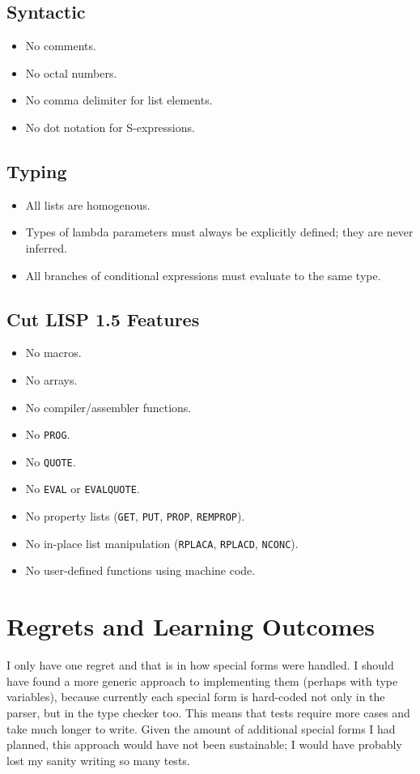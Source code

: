 \documentclass[a4paper, 12pt]{article}
\begin{document}
\subsection{Syntactic}
\begin{itemize}
    \item No comments.
    \item No octal numbers.
    \item No comma delimiter for list elements.
    \item No dot notation for S-expressions.
\end{itemize}

\subsection{Typing}
\begin{itemize}
    \item All lists are homogenous.
    \item Types of lambda parameters must always be explicitly defined; they are never inferred.
    \item All branches of conditional expressions must evaluate to the same type.
\end{itemize}

\subsection{Cut LISP 1.5 Features}
\begin{itemize}
    \item No macros.
    \item No arrays.
    \item No compiler/assembler functions.
    \item No \texttt{PROG}.
    \item No \texttt{QUOTE}.
    \item No \texttt{EVAL} or \texttt{EVALQUOTE}.
    \item No property lists (\texttt{GET}, \texttt{PUT}, \texttt{PROP}, \texttt{REMPROP}).
    \item No in-place list manipulation (\texttt{RPLACA}, \texttt{RPLACD}, \texttt{NCONC}).
    \item No user-defined functions using machine code.
\end{itemize}

\section{Regrets and Learning Outcomes}
I only have one regret and that is in how special forms were handled. I should have found a more generic approach to implementing them (perhaps with type variables), because currently each special form is hard-coded not only in the parser, but in the type checker too. This means that tests require more cases and take much longer to write. Given the amount of additional special forms I had planned, this approach would have not been sustainable; I would have probably lost my sanity writing so many tests.
\end{document}
